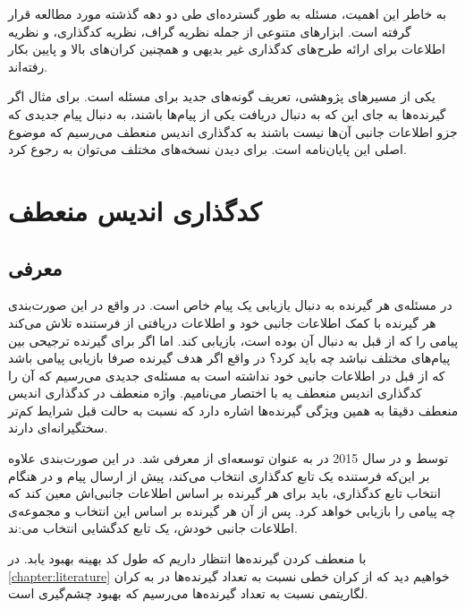به خاطر این اهمیت، مسئله \icod به طور گسترده‌ای طی دو دهه گذشته مورد مطالعه قرار گرفته است. ابزارهای متنوعی از جمله نظریه گراف، نظریه کدگذاری، و نظریه اطلاعات برای ارائه طرح‌های کدگذاری غیر بدیهی
\cite{25, 101, 22, 43, 114, 29, 8, 104, 81, 130, 7, 9, 149, 116, 80, 141, 146, 162}
و همچنین کران‌‌های بالا و پایین 
\cite{160, 22, 55, 28, 17, 141}
 بکار رفته‌اند.
 
 یکی از مسیرهای پژوهشی، تعریف گونه‌های جدید برای مسئله است. برای مثال اگر گیرنده‌ها به جای این که به دنبال دریافت یکی از پیام‌ها باشند، به دنبال پیام جدیدی که جزو اطلاعات جانبی آن‌ها نیست باشند به کدگذاری اندیس منعطف می‌رسیم که موضوع اصلی این پایان‌نامه است. برای دیدن نسخه‌های مختلف می‌توان به
 \cite{pliablefirstpaper, verypliable, byrne2023preferential}
 رجوع کرد.
 \pagebreak
 \section{کدگذاری اندیس منعطف}
 
 \subsection{معرفی}
 در مسئله‌ی
 \icod
 هر گیرنده به دنبال یازیابی یک پیام خاص است. در واقع در این صورت‌بندی هر گیرنده با کمک اطلاعات جانبی خود و اطلاعات دریافتی از فرستنده تلاش می‌کند پیامی را که از قبل به دنبال آن بوده است، بازیابی کند. اما اگر برای گیرنده ترجیحی بین پیام‌های مختلف نباشد چه باید کرد؟ در واقع اگر هدف گیرنده صرفا بازیابی پیامی باشد که از قبل در اطلاعات جانبی خود نداشته است به مسئله‌ی جدیدی می‌رسیم که آن را کدگذاری اندیس منعطف یه با اختصار \picod می‌نامیم. واژه منعطف در کدگذاری اندیس منعطف دقیقا به همین ویژگی گیرنده‌ها اشاره دارد که نسبت به حالت قبل شرایط کم‌تر سختگیرانه‌ای دارند.
 
 \picod توسط 
 و 
  در سال 2015 در
 \cite{pliablefirstpaper}
 به عنوان توسعه‌ای از \icod معرفی شد. در این صورت‌بندی علاوه بر این‌که فرستنده یک تابع کدگذاری انتخاب می‌کند، پیش از ارسال پیام و در هنگام انتخاب تابع کدگذاری، باید برای هر گیرنده بر اساس اطلاعات جانبی‌اش معین کند که چه پیامی را بازيابی خواهد کرد. پس از آن هر گیرنده بر اساس این انتخاب و مجموعه‌ی اطلاعات جانبی خودش، یک تابع کدگشایی انتخاب می‌:ند.
 
 با منعطف کردن گیرنده‌ها انتظار داریم که طول کد بهینه بهبود یابد. در 
 \autoref{chapter:literature}
 خواهیم دید که از کران خطی نسبت به تعداد گیرنده‌ها در
 \icod
 به کران لگاریتمی نسبت به تعداد گیرنده‌ها می‌رسیم که بهبود چشم‌گیری است.
 
